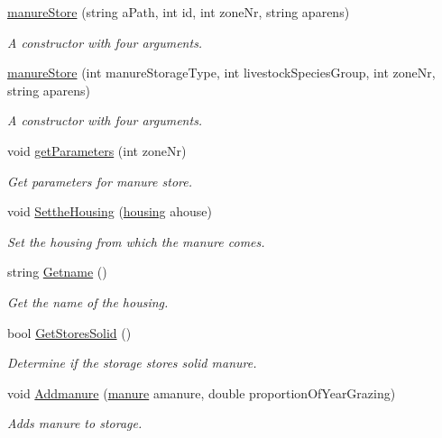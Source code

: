 \begin{DoxyCompactItemize}
\mbox{\hyperlink{classmanure_store_ad428129a6d888e64fbfaf67d821f7311}{manure\+Store}} (string a\+Path, int id, int zone\+Nr, string aparens)
\begin{DoxyCompactList}\small\item\em A constructor with four arguments. \end{DoxyCompactList}\item 
\mbox{\hyperlink{classmanure_store_aa3f8134d90ba9c6d1939ae195cf452de}{manure\+Store}} (int manure\+Storage\+Type, int livestock\+Species\+Group, int zone\+Nr, string aparens)
\begin{DoxyCompactList}\small\item\em A constructor with four arguments. \end{DoxyCompactList}\item 
void \mbox{\hyperlink{classmanure_store_acc4d7b113dd3294a798a4c57df282ccd}{get\+Parameters}} (int zone\+Nr)
\begin{DoxyCompactList}\small\item\em Get parameters for manure store. \end{DoxyCompactList}\item 
void \mbox{\hyperlink{classmanure_store_a12a1c24ccbb83a3bb556202613d2971c}{Setthe\+Housing}} (\mbox{\hyperlink{classhousing}{housing}} ahouse)
\begin{DoxyCompactList}\small\item\em Set the housing from which the manure comes. \end{DoxyCompactList}\item 
string \mbox{\hyperlink{classmanure_store_a06d53dd5f1bd637c0f27c968ef63f8cf}{Getname}} ()
\begin{DoxyCompactList}\small\item\em Get the name of the housing. \end{DoxyCompactList}\item 
bool \mbox{\hyperlink{classmanure_store_ad1ec2e50223e778b18e3a76ae6b5a627}{Get\+Stores\+Solid}} ()
\begin{DoxyCompactList}\small\item\em Determine if the storage stores solid manure. \end{DoxyCompactList}\item 
void \mbox{\hyperlink{classmanure_store_a5254b8e9e76a105f39eed9ef9b6a6c38}{Addmanure}} (\mbox{\hyperlink{classmanure}{manure}} amanure, double proportion\+Of\+Year\+Grazing)
\begin{DoxyCompactList}\small\item\em Adds manure to storage. \end{DoxyCompactList}\item 

\end{DoxyCompactItemize}
